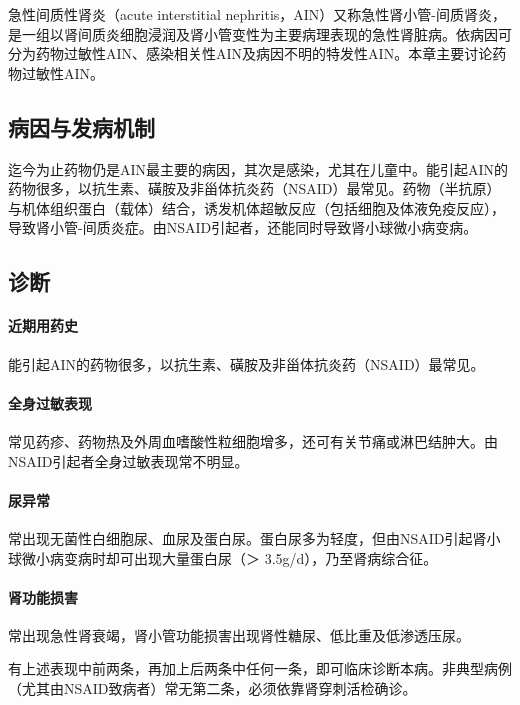 急性间质性肾炎（acute interstitial
nephritis，AIN）又称急性肾小管-间质肾炎，是一组以肾间质炎细胞浸润及肾小管变性为主要病理表现的急性肾脏病。依病因可分为药物过敏性AIN、感染相关性AIN及病因不明的特发性AIN。本章主要讨论药物过敏性AIN。

\subsection{病因与发病机制}

迄今为止药物仍是AIN最主要的病因，其次是感染，尤其在儿童中。能引起AIN的药物很多，以抗生素、磺胺及非甾体抗炎药（NSAID）最常见。药物（半抗原）与机体组织蛋白（载体）结合，诱发机体超敏反应（包括细胞及体液免疫反应），导致肾小管-间质炎症。由NSAID引起者，还能同时导致肾小球微小病变病。

\subsection{诊断}

\paragraph{近期用药史}

能引起AIN的药物很多，以抗生素、磺胺及非甾体抗炎药（NSAID）最常见。

\paragraph{全身过敏表现}

常见药疹、药物热及外周血嗜酸性粒细胞增多，还可有关节痛或淋巴结肿大。由NSAID引起者全身过敏表现常不明显。

\paragraph{尿异常}

常出现无菌性白细胞尿、血尿及蛋白尿。蛋白尿多为轻度，但由NSAID引起肾小球微小病变病时却可出现大量蛋白尿（＞
3.5g/d），乃至肾病综合征。

\paragraph{肾功能损害}

常出现急性肾衰竭，肾小管功能损害出现肾性糖尿、低比重及低渗透压尿。

有上述表现中前两条，再加上后两条中任何一条，即可临床诊断本病。非典型病例（尤其由NSAID致病者）常无第二条，必须依靠肾穿刺活检确诊。

